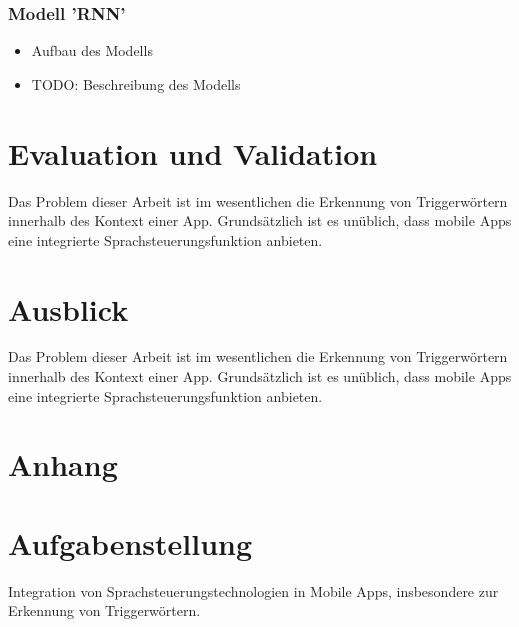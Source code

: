 \documentclass[11pt,a4paper]{article}
\newcommand\blankpage{%
	\null
	\thispagestyle{empty}%
	\addtocounter{page}{-1}%
	\newpage}
\begin{document}
\subsubsection{Modell 'RNN'}
\begin{itemize}
    \item Aufbau des Modells 
    \item TODO: Beschreibung des Modells

\end{itemize}



\newpage \section{Evaluation und Validation}
Das Problem dieser Arbeit ist im wesentlichen die Erkennung von Triggerwörtern innerhalb
des Kontext einer App. Grundsätzlich ist es unüblich, dass mobile Apps eine
integrierte Sprachsteuerungsfunktion anbieten.

\newpage \section{Ausblick}
Das Problem dieser Arbeit ist im wesentlichen die Erkennung von Triggerwörtern innerhalb
des Kontext einer App. Grundsätzlich ist es unüblich, dass mobile Apps eine
integrierte Sprachsteuerungsfunktion anbieten.

\newpage \section{Anhang}


\clearpage
\printglossary[type=\acronymtype,title=Akronyme]
\printglossary[title=Glossar]
\listoffigures
{}
\listoftables
\printbibliography[title=Literaturverzeichnis, heading=bibintoc]





\newpage
\pagecolor{ba-gray}
\afterpage{\nopagecolor}
\blankpage

\newpage

\section*{Aufgabenstellung}
Integration von Sprachsteuerungstechnologien in Mobile Apps, insbesondere zur Erkennung
von Triggerwörtern.
\end{document}
